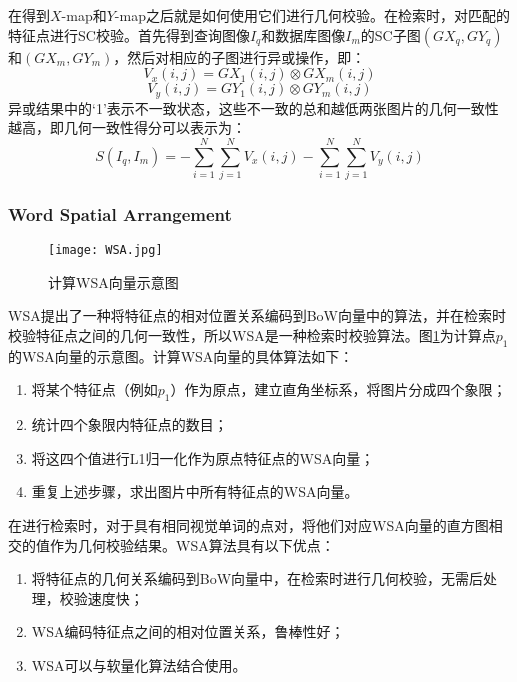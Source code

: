 在得到$X$-map和$Y$-map之后就是如何使用它们进行几何校验。在检索时，对匹配的特征点进行SC校验。首先得到查询图像$I_q$和数据库图像$I_m$的SC子图$(GX_q,GY_q)$和$(GX_m,GY_m)$，然后对相应的子图进行异或操作，即：
\begin{equation}
V_x(i,j)=GX_1(i,j)\otimes GX_m(i,j)
\end{equation}
\begin{equation}
V_y(i,j)=GY_1(i,j)\otimes GY_m(i,j)
\end{equation}
异或结果中的‘1’表示不一致状态，这些不一致的总和越低两张图片的几何一致性越高，即几何一致性得分可以表示为：
\begin{equation}
S(I_q,I_m)=-\sum_{i=1}^{N}\sum_{j=1}^{N}V_x(i,j) - \sum_{i=1}^{N}\sum_{j=1}^{N}V_y(i,j)
\end{equation}


\subsubsection{Word Spatial Arrangement}
\begin{figure}[h]
	\centering
	\texttt{[image: WSA.jpg]}
	\caption{计算WSA向量示意图}\label{fig:wsa}
\end{figure}
WSA提出了一种将特征点的相对位置关系编码到BoW向量中的算法，并在检索时校验特征点之间的几何一致性，所以WSA是一种检索时校验算法。图\ref{fig:wsa}为计算点$p_1$的WSA向量的示意图。计算WSA向量的具体算法如下：
\begin{enumerate}
	\item 将某个特征点（例如$p_1$）作为原点，建立直角坐标系，将图片分成四个象限；
	\item 统计四个象限内特征点的数目；
	\item 将这四个值进行L1归一化作为原点特征点的WSA向量；
	\item 重复上述步骤，求出图片中所有特征点的WSA向量。
\end{enumerate}

在进行检索时，对于具有相同视觉单词的点对，将他们对应WSA向量的直方图相交的值作为几何校验结果。WSA算法具有以下优点：
\begin{enumerate}
	\item 将特征点的几何关系编码到BoW向量中，在检索时进行几何校验，无需后处理，校验速度快；
	\item WSA编码特征点之间的相对位置关系，鲁棒性好；
	\item WSA可以与软量化\cite{philbin2008lost}算法结合使用。
\end{enumerate}

